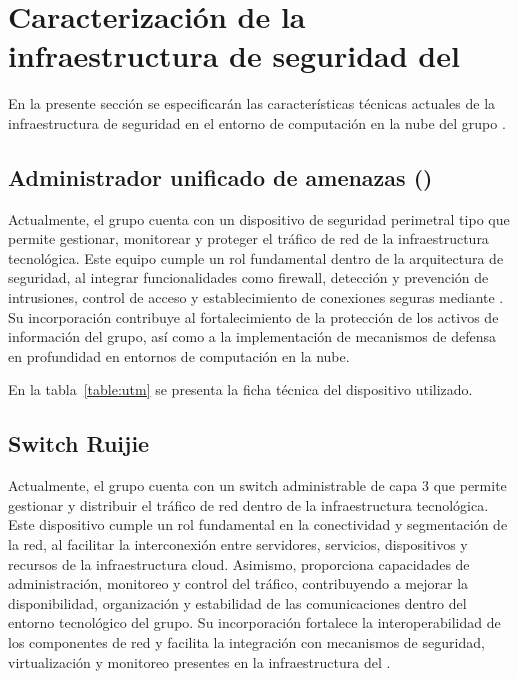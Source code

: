 \section{Caracterización de la infraestructura de seguridad del \GRID}
\noindent
En la presente sección se especificarán las características técnicas actuales de la infraestructura de seguridad en el entorno de 
computación en la nube del grupo \GRID.


\subsection{Administrador unificado de amenazas (\UTM)}\label{sec:utm}
\noindent

Actualmente, el grupo \GRID cuenta con un dispositivo de seguridad perimetral tipo \UTM que permite gestionar, monitorear y proteger el 
tráfico de red de la infraestructura tecnológica. Este equipo cumple un rol fundamental dentro de la arquitectura de seguridad, al 
integrar funcionalidades como firewall, detección y prevención de intrusiones, control de acceso y establecimiento de conexiones seguras 
mediante \VPN. Su incorporación contribuye al fortalecimiento de la protección de los activos de información del grupo, así como a la 
implementación de mecanismos de defensa en profundidad en entornos de computación en la nube. 


En la tabla~\ref{table:utm} se presenta la ficha técnica del dispositivo utilizado.\\

\subsection{Switch Ruijie}\label{sec:switch-ruijie}
\noindent

Actualmente, el grupo \GRID cuenta con un switch administrable de capa 3 que permite gestionar y distribuir el tráfico de red dentro de la 
infraestructura tecnológica. Este dispositivo cumple un rol fundamental en la conectividad y segmentación de la red, al facilitar la 
interconexión entre servidores, servicios, dispositivos y recursos de la infraestructura cloud. Asimismo, proporciona capacidades de 
administración, monitoreo y control del tráfico, contribuyendo a mejorar la disponibilidad, organización y estabilidad de las 
comunicaciones dentro del entorno tecnológico del grupo. Su incorporación fortalece la interoperabilidad de los componentes de red y 
facilita la integración con mecanismos de seguridad, virtualización y monitoreo presentes en la infraestructura del \GRID.

